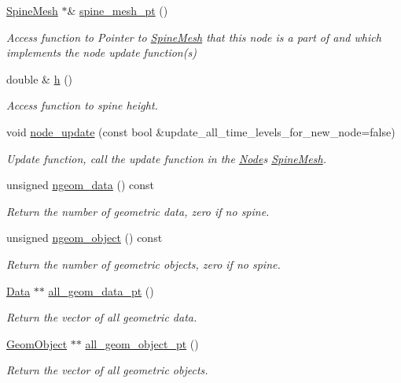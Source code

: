 \begin{DoxyCompactItemize}
\hyperlink{classoomph_1_1SpineMesh}{Spine\+Mesh} $\ast$\& \hyperlink{classoomph_1_1SpineNode_a6d7bf6495db8e7bb000ed2d48aaced4d}{spine\+\_\+mesh\+\_\+pt} ()
\begin{DoxyCompactList}\small\item\em Access function to Pointer to \hyperlink{classoomph_1_1SpineMesh}{Spine\+Mesh} that this node is a part of and which implements the node update function(s) \end{DoxyCompactList}\item 
double \& \hyperlink{classoomph_1_1SpineNode_a531445631907d2b2164c26f25763fb57}{h} ()
\begin{DoxyCompactList}\small\item\em Access function to spine height. \end{DoxyCompactList}\item 
void \hyperlink{classoomph_1_1SpineNode_afc47a59bee4ca3e42a56545afe20876d}{node\+\_\+update} (const bool \&update\+\_\+all\+\_\+time\+\_\+levels\+\_\+for\+\_\+new\+\_\+node=false)
\begin{DoxyCompactList}\small\item\em Update function, call the update function in the \hyperlink{classoomph_1_1Node}{Node}\textquotesingle{}s \hyperlink{classoomph_1_1SpineMesh}{Spine\+Mesh}. \end{DoxyCompactList}\item 
unsigned \hyperlink{classoomph_1_1SpineNode_a46735b4f430014997c525134c0889b4d}{ngeom\+\_\+data} () const
\begin{DoxyCompactList}\small\item\em Return the number of geometric data, zero if no spine. \end{DoxyCompactList}\item 
unsigned \hyperlink{classoomph_1_1SpineNode_afba3d62d2da3b8fa6421958fda3f0a14}{ngeom\+\_\+object} () const
\begin{DoxyCompactList}\small\item\em Return the number of geometric objects, zero if no spine. \end{DoxyCompactList}\item 
\hyperlink{classoomph_1_1Data}{Data} $\ast$$\ast$ \hyperlink{classoomph_1_1SpineNode_a0fbb7845412caffe3908f6d972f9df87}{all\+\_\+geom\+\_\+data\+\_\+pt} ()
\begin{DoxyCompactList}\small\item\em Return the vector of all geometric data. \end{DoxyCompactList}\item 
\hyperlink{classoomph_1_1GeomObject}{Geom\+Object} $\ast$$\ast$ \hyperlink{classoomph_1_1SpineNode_a420fcf9b30eea609308298dd54558f92}{all\+\_\+geom\+\_\+object\+\_\+pt} ()
\begin{DoxyCompactList}\small\item\em Return the vector of all geometric objects. \end{DoxyCompactList}\end{DoxyCompactItemize}
